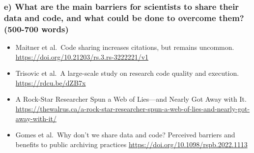 \documentclass[
]{article}
\providecommand{\tightlist}{%
  \setlength{\itemsep}{0pt}\setlength{\parskip}{0pt}}
\begin{document}
\subsubsection{e) What are the main barriers for scientists to share
their data and code, and what could be done to overcome them? (500-700
words)}\label{e-what-are-the-main-barriers-for-scientists-to-share-their-data-and-code-and-what-could-be-done-to-overcome-them-500-700-words}

\begin{itemize}
\tightlist
\item
  Maitner et al.~Code sharing increases citations, but remains uncommon.
  \url{https://doi.org/10.21203/rs.3.rs-3222221/v1}
\item
  Trisovic et al.~A large-scale study on research code quality and
  execution. \url{https://rdcu.be/dZB7x}
\item
  A Rock-Star Researcher Spun a Web of Lies---and Nearly Got Away with
  It.
  \url{https://thewalrus.ca/a-rock-star-researcher-spun-a-web-of-lies-and-nearly-got-away-with-it/}
\item
  Gomes et al.~Why don't we share data and code? Perceived barriers and
  benefits to public archiving practices
  \url{https://doi.org/10.1098/rspb.2022.1113}
\end{itemize}
\end{document}
